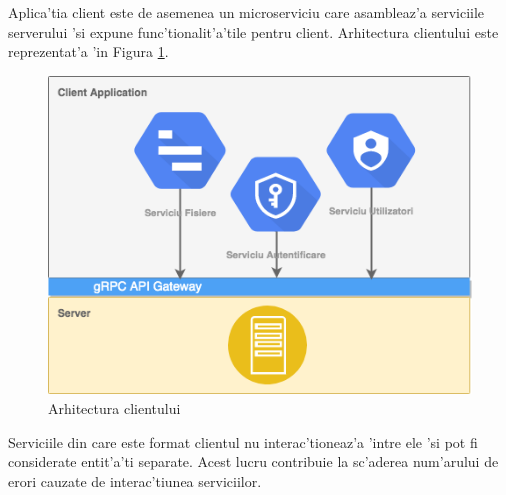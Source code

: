 \documentclass[12pt,a4paper,twoside]{report}
\begin{document}
 Aplica'tia client este de asemenea un microserviciu care asambleaz'a serviciile serverului 'si expune func'tionalit'a'tile pentru client. Arhitectura clientului este reprezentat'a 'in Figura \ref{client_arch}.
 
 \begin{figure}[H]
\begin{center}
\advance\leftskip-3cm
\advance\rightskip-3cm
\includegraphics[keepaspectratio=true,scale=0.58]{img/client_arch.png}
\caption{Arhitectura clientului}
\label{client_arch}
\end{center}
\end{figure}
 
Serviciile din care este format clientul nu interac'tioneaz'a 'intre ele 'si pot fi considerate entit'a'ti separate. Acest lucru contribuie la sc'aderea num'arului de erori cauzate de interac'tiunea serviciilor.
\end{document}
